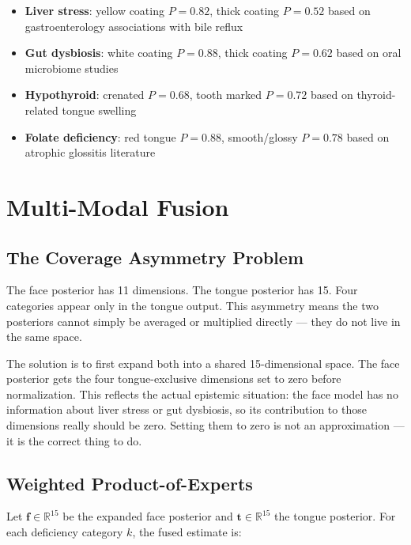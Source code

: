 \documentclass[journal]{IEEEtran}
\begin{document}
\begin{itemize}
  \item \textbf{Liver stress}: yellow coating $P = 0.82$, thick coating $P = 0.52$
    based on gastroenterology associations with bile reflux~\cite{whitfield2006}
  \item \textbf{Gut dysbiosis}: white coating $P = 0.88$, thick coating $P = 0.62$
    based on oral microbiome studies~\cite{phua2012}
  \item \textbf{Hypothyroid}: crenated $P = 0.68$, tooth marked $P = 0.72$
    based on thyroid-related tongue swelling~\cite{roberts2004}
  \item \textbf{Folate deficiency}: red tongue $P = 0.88$, smooth/glossy $P = 0.78$
    based on atrophic glossitis literature~\cite{devalia2014}
\end{itemize}

\section{Multi-Modal Fusion}
\label{sec:fusion}

\subsection{The Coverage Asymmetry Problem}

The face posterior has 11 dimensions. The tongue posterior has 15. Four categories
appear only in the tongue output. This asymmetry means the two posteriors cannot
simply be averaged or multiplied directly --- they do not live in the same space.

The solution is to first expand both into a shared 15-dimensional space. The face
posterior gets the four tongue-exclusive dimensions set to zero before normalization.
This reflects the actual epistemic situation: the face model has no information about
liver stress or gut dysbiosis, so its contribution to those dimensions really should
be zero. Setting them to zero is not an approximation --- it is the correct thing to do.

\subsection{Weighted Product-of-Experts}

Let $\mathbf{f} \in \mathbb{R}^{15}$ be the expanded face posterior and
$\mathbf{t} \in \mathbb{R}^{15}$ the tongue posterior. For each deficiency
category $k$, the fused estimate is:
\end{document}
